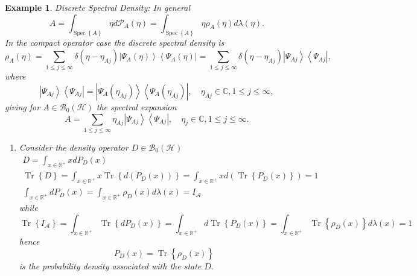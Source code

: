 \documentclass[aps,preprint]{revtex4}%
\newtheorem{example}[theorem]{Example}
\begin{document}
\begin{example}
Discrete Spectral Density: In general
\begin{equation}
A=\int_{\operatorname*{Spec}\left\{  A\right\}  }\eta d\mathcal{P}_{A}\left(
\eta\right)  =\int_{\operatorname*{Spec}\left\{  A\right\}  }\eta\rho
_{A}\left(  \eta\right)  d\mathcal{\lambda}\left(  \eta\right)  .
\end{equation}
In the compact operator case the discrete spectral density is
\begin{equation}
\rho_{A}\left(  \eta\right)  =\sum_{1\leq j\leq\infty}\delta\left(  \eta
-\eta_{Aj}\right)  \left\vert \Psi_{A}\left(  \eta\right)  \right\rangle
\left\langle \Psi_{A}\left(  \eta\right)  \right\vert =\sum_{1\leq j\leq
\infty}\delta\left(  \eta-\eta_{Aj}\right)  \left\vert \Psi_{Aj}\right\rangle
\left\langle \Psi_{Aj}\right\vert ,
\end{equation}
where
\begin{equation}
\left\vert \Psi_{Aj}\right\rangle \left\langle \Psi_{Aj}\right\vert
=\left\vert \Psi_{A}\left(  \eta_{Aj}\right)  \right\rangle \left\langle
\Psi_{A}\left(  \eta_{Aj}\right)  \right\vert ,\quad\eta_{Aj}\in
\mathbb{C},1\leq j\leq\infty,
\end{equation}
giving for $A\in\mathcal{B}_{0}\left(  \mathcal{H}\right)  $ the spectral
expansion%
\begin{equation}
A=\sum_{1\leq j\leq\infty}\eta_{Aj}\left\vert \Psi_{Aj}\right\rangle
\left\langle \Psi_{Aj}\right\vert ,\quad\eta_{j}\in\mathbb{C},1\leq
j\leq\infty.
\end{equation}


\begin{enumerate}
\item Consider the density operator $D\in\mathcal{B}_{0}\left(  \mathcal{H}%
\right)  $
\begin{gather}
D=\int_{x\in\mathbb{R}^{+}}xdP_{D}\left(  x\right) \\
\operatorname{Tr}\left\{  D\right\}  =\int_{x\in\mathbb{R}^{+}}%
x\operatorname{Tr}\left\{  d\left(  P_{D}\left(  x\right)  \right)  \right\}
=\int_{x\in\mathbb{R}^{+}}xd\left(  \operatorname{Tr}\left\{  P_{D}\left(
x\right)  \right\}  \right)  =1\\
\int_{x\in\mathbb{R}^{+}}dP_{D}\left(  x\right)  =\int_{x\in\mathbb{R}^{+}%
}\rho_{D}\left(  x\right)  d\lambda\left(  x\right)  =I_{\mathcal{A}}%
\end{gather}
while%
\begin{equation}
\operatorname{Tr}\left\{  I_{\mathcal{A}}\right\}  =\int_{x\in\mathbb{R}^{+}%
}\operatorname{Tr}\left\{  dP_{D}\left(  x\right)  \right\}  =\int%
_{x\in\mathbb{R}^{+}}d\operatorname{Tr}\left\{  P_{D}\left(  x\right)
\right\}  =\int_{x\in\mathbb{R}^{+}}\operatorname{Tr}\left\{  \rho_{D}\left(
x\right)  \right\}  d\lambda\left(  x\right)  =1
\end{equation}
hence
\begin{equation}
P_{D}\left(  x\right)  =\operatorname{Tr}\left\{  \rho_{D}\left(  x\right)
\right\}
\end{equation}
is the \emph{probability density} associated with the state $D.$


\end{enumerate}
\end{example}
\end{document}
